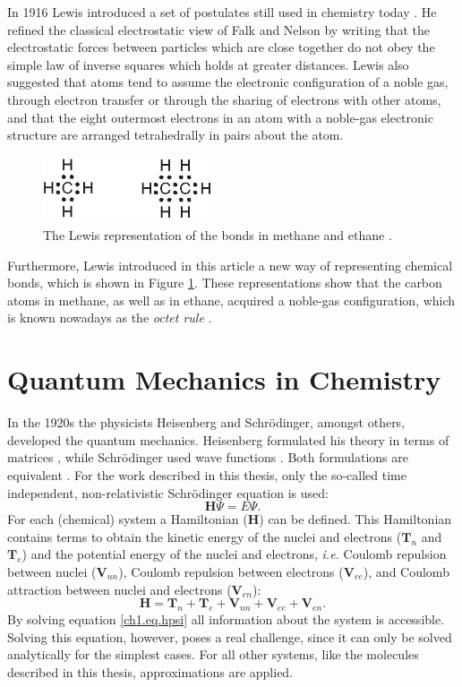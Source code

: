 In 1916 Lewis introduced a set of postulates still used in chemistry today \cite{lewis}. He refined the classical electrostatic view of Falk and Nelson by writing that the electrostatic forces between particles which are close together do not obey the simple law of inverse squares which holds at greater distances. Lewis also suggested that atoms tend to assume the electronic configuration of a noble gas, through electron transfer or through the sharing of electrons with other atoms, and that the eight outermost electrons in an atom with a noble-gas electronic structure are arranged tetrahedrally in pairs about the atom.
\begin{figure}[htdp]
\center
\includegraphics[width=2in]{introduction/figures/figure2.eps}
\caption{The Lewis representation of the bonds in methane and ethane \cite{lewis}.}
\label{ch1.fig2}
\end{figure}
Furthermore, Lewis introduced in this article a new way of representing chemical bonds, which is shown in Figure \ref{ch1.fig2}. These representations show that the carbon atoms in methane, as well as in ethane, acquired a noble-gas configuration, which is known nowadays as the \textit{octet rule} \cite{bruice}.

\section{Quantum Mechanics in Chemistry}

In the 1920s the physicists Heisenberg and Schr\"{o}dinger, amongst others, developed the quantum mechanics. Heisenberg formulated his theory in terms of matrices \cite{heisenberg}, while Schr\"{o}dinger used wave functions \cite{schrodinger1,schrodinger2}. Both formulations are equivalent \cite{schrodinger3}. For the work described in this thesis, only the so-called time independent, non-relativistic Schr\"{o}dinger equation is used:
\begin{equation}
\mathbf{H} \Psi=E \Psi.
\label{ch1.eq.hpsi}
\end{equation}
For each (chemical) system a Hamiltonian ($\mathbf{H}$) can be defined. This Hamiltonian contains terms to obtain the kinetic energy of the nuclei and electrons ($\mathbf{T}_n$ and $\mathbf{T}_e$) and the potential energy of the nuclei and electrons, \textit{i.e.} Coulomb repulsion between nuclei ($\mathbf{V}_{nn}$), Coulomb repulsion between electrons ($\mathbf{V}_{ee}$), and Coulomb attraction between nuclei and electrons ($\mathbf{V}_{en}$):
\begin{equation}
\mathbf{H} = \mathbf{T}_n + \mathbf{T}_e + \mathbf{V}_{nn} + \mathbf{V}_{ee} + \mathbf{V}_{en}.
\label{ch1.eq.htotal}
\end{equation}
By solving equation \ref{ch1.eq.hpsi} all information about the system is accessible. Solving this equation, however, poses a real challenge, since it can only be solved analytically for the simplest cases. For all other systems, like the molecules described in this thesis, approximations are applied.

